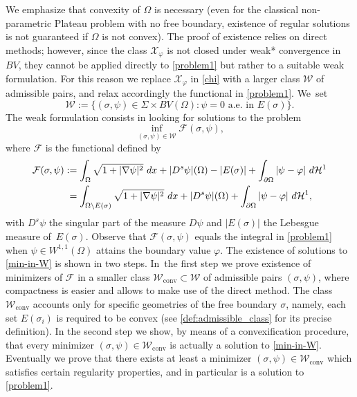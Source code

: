 \documentclass[JEP,XML,SOM,Unicode, NoFloatCountersInSection,published]{cedram}
\newcommand{\largercomp}{\mathcal W}
\let\curves\Sigma
\let\Om\Omega
\newcommand\admclassconv{{\mathcal W_\mathrm{conv}}}
\theoremstyle{definition}
\begin{document}
We emphasize that convexity of $\Om$ is necessary (even for the classical non-parametric Plateau problem with no free boundary, existence of regular solutions is not guaranteed if $\Omega$ is not convex).
The proof of existence relies on direct methods; however, since the class $\mathcal X_\varphi$ is not closed under weak* convergence in $BV$, they cannot be applied directly to \eqref{problem1} but
rather to a suitable weak formulation. For this reason we replace $\mathcal X_\varphi$ in \eqref{chi} with a larger class $\mathcal W$ of admissible pairs, and relax accordingly the functional in \eqref{problem1}. We~set
\begin{equation}\label{def:admissible_class_bis}
\largercomp
:=\big\{(\sigma,\psi)\in \curves \times BV(\Omega): \psi=0\text{ a.e. in }E(\sigma)\big\}.
\end{equation}
The weak formulation consists in looking for solutions to the problem
\begin{equation}\label{min-in-W}
\inf_{(\sigma,\psi)\in\mathcal W}\mathcal F(\sigma,\psi),
\end{equation}
where $\mathcal F$ is the functional defined by
\begin{align}\label{def:relaxed_functional}
\mathcal F(\sigma,\psi)
&:=\int_\Om\sqrt{1+|\nabla\psi|^2}~dx+|D^s\psi|(\Om)-|E(\sigma)|+\int_{\partial\Omega}|\psi-\varphi|~d\mathcal H^1\nonumber\\
&\hphantom{:}=\int_{\Om\setminus E(\sigma)}\sqrt{1+|\nabla\psi|^2}~dx+|D^s\psi|(\Om)+\int_{\partial\Omega}|\psi-\varphi|~d\mathcal H^1,
\end{align}
with $D^s\psi$ the singular part of the measure
$D\psi$ and $|E(\sigma)|$ the Lebesgue measure of~$E(\sigma)$.
Observe that $\mathcal F(\sigma,\psi)$
equals the integral in \eqref{problem1} when $\psi\in W^{1,1}(\Om)$ attains the boundary value $\varphi$.
The existence of solutions to \eqref{min-in-W} is shown in two steps. In~the first step we prove existence of minimizers of $\mathcal F$ in a smaller
class $\admclassconv\subset\mathcal W$ of admissible pairs $(\sigma,\psi)$,
where compactness is easier and allows to make use of the direct method.
The class $\admclassconv$
accounts only for specific geometries of the free boundary $\sigma$,
namely, each set $E(\sigma_i)$ is required to be convex (see \eqref{def:admissible_class} for its precise definition).
In the second step we show,
by means of a convexification procedure, that every minimizer $(\sigma,\psi)\in\admclassconv$ is actually a solution to \eqref{min-in-W}.
Eventually we prove that there exists at least a minimizer $(\sigma,\psi)\in\admclassconv$ which satisfies certain regularity properties, and in particular is a solution to \eqref{problem1}.
\end{document}
